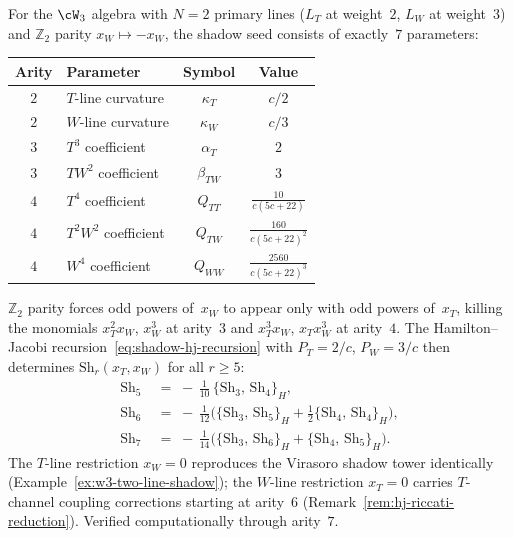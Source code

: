 \begin{corollary}
\label{cor:w3-reconstruction}
\ClaimStatusProvedHere
{}
For the $\cW_3$ algebra with $N = 2$ primary lines
\textup{(}$L_T$ at weight~$2$, $L_W$ at weight~$3$\textup{)}
and $\mathbb{Z}_2$ parity $x_W \mapsto -x_W$, the shadow
seed consists of exactly~$7$ parameters:
\begin{center}
\renewcommand{\arraystretch}{1.25}
\begin{tabular}{clcc}
\toprule
\textbf{Arity} & \textbf{Parameter} & \textbf{Symbol} &
  \textbf{Value} \\
\midrule
$2$ & $T$-line curvature & $\kappa_T$ & $c/2$ \\
$2$ & $W$-line curvature & $\kappa_W$ & $c/3$ \\
$3$ & $T^3$ coefficient & $\alpha_T$ & $2$ \\
$3$ & $T W^2$ coefficient & $\beta_{TW}$ & $3$ \\
$4$ & $T^4$ coefficient & $Q_{TT}$ &
  $\frac{10}{c(5c{+}22)}$ \\
$4$ & $T^2 W^2$ coefficient & $Q_{TW}$ &
  $\frac{160}{c(5c{+}22)^2}$ \\
$4$ & $W^4$ coefficient & $Q_{WW}$ &
  $\frac{2560}{c(5c{+}22)^3}$ \\
\bottomrule
\end{tabular}
\end{center}
\noindent
$\mathbb{Z}_2$ parity forces odd powers of~$x_W$ to appear
only with odd powers of~$x_T$, killing the monomials
$x_T^2 x_W$, $x_W^3$ at arity~$3$ and
$x_T^3 x_W$, $x_T x_W^3$ at arity~$4$.
The Hamilton--Jacobi
recursion~\eqref{eq:shadow-hj-recursion}
with $P_T = 2/c$, $P_W = 3/c$ then determines
$\mathrm{Sh}_r(x_T, x_W)$ for all $r \geq 5$:
\begin{align}
  \mathrm{Sh}_5 &\;=\;
  -\,\frac{1}{10}\,
  \{\mathrm{Sh}_3,\, \mathrm{Sh}_4\}_H,
  \label{eq:w3-sh5} \\
  \mathrm{Sh}_6 &\;=\;
  -\,\frac{1}{12}\bigl(
  \{\mathrm{Sh}_3,\, \mathrm{Sh}_5\}_H
  + \tfrac{1}{2}\{\mathrm{Sh}_4,\, \mathrm{Sh}_4\}_H
  \bigr), \\
  \mathrm{Sh}_7 &\;=\;
  -\,\frac{1}{14}\bigl(
  \{\mathrm{Sh}_3,\, \mathrm{Sh}_6\}_H
  + \{\mathrm{Sh}_4,\, \mathrm{Sh}_5\}_H
  \bigr). \label{eq:w3-sh7}
\end{align}
The $T$-line restriction $x_W = 0$ reproduces the Virasoro
shadow tower identically
\textup{(}Example~\textup{\ref{ex:w3-two-line-shadow}});
the $W$-line restriction $x_T = 0$ carries $T$-channel
coupling corrections starting at arity~$6$
\textup{(}Remark~\textup{\ref{rem:hj-riccati-reduction}}).
Verified computationally through arity~$7$.
\end{corollary}

